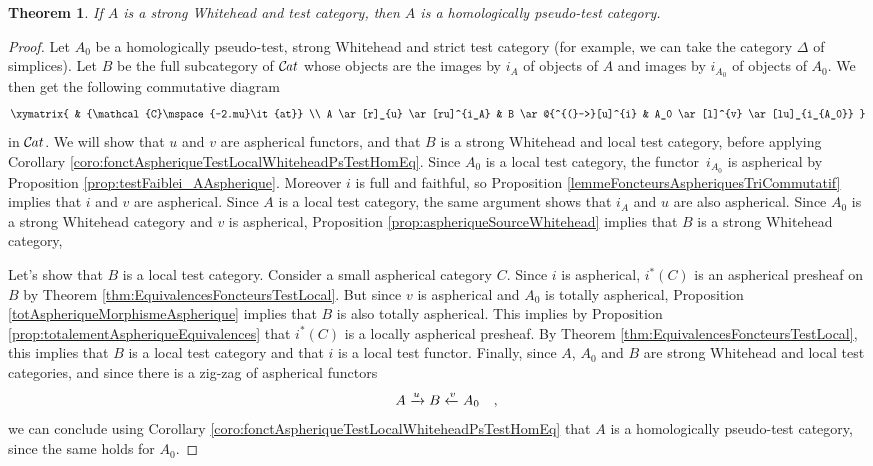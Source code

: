 \documentclass[10pt, english, a4paper, nothms]{amsart}
\theoremstyle{plain}
\newtheorem{theorem}{Theorem}[section]
\theoremstyle{remark}
\theoremstyle{definition}
\numberwithin{equation}{theorem}
\newcommand{\Cat}{{\mathcal{C}\mspace{-2.mu}\it{at}}}
\newcommand\zbox[1]{\makebox[0pt][l]{#1}}
\newcommand\pbox[1]{\zbox{\quad #1}} %
\begin{document}
\begin{theorem}\label{thm:WhiteheadTestHomPseudoTest}
If $A$ is a strong Whitehead and test category, then $A$ is a
homologically pseudo-test category.
\end{theorem}
\begin{proof}
Let $A_0$ be a homologically pseudo-test, strong Whitehead and
strict test category (for example, we can take the category $\Delta$
of simplices). Let $B$ be the full subcategory of $\Cat$ whose objects
are the images by $i_A$ of objects of $A$ and images by $i_{A_0}$ of
objects of $A_0$. We then get the following commutative diagram
\[
\xymatrix{
& \Cat 
\\
A \ar[r]_{u} \ar[ru]^{i_A} &
B \ar@{^{(}->}[u]^{i} &
A_0 \ar[l]^{v} \ar[lu]_{i_{A_0}} 
} 
\]
in $\Cat$. We will show that $u$ and $v$ are aspherical functors, and
that $B$ is a strong Whitehead and local test category, before applying
Corollary \ref{coro:fonctAspheriqueTestLocalWhiteheadPsTestHomEq}.
Since $A_0$ is a local test category, the functor~$i_{A_0}$ is
aspherical by Proposition \ref{prop:testFaiblei_AAspherique}.
Moreover $i$ is full and faithful, so Proposition
\ref{lemmeFoncteursAspheriquesTriCommutatif} implies that $i$ and $v$ are
aspherical. Since $A$ is a local test category, the same argument shows that
$i_A$ and $u$ are also aspherical. Since $A_0$ is a strong Whitehead category
and $v$ is aspherical, Proposition \ref{prop:aspheriqueSourceWhitehead} implies
that $B$ is a strong Whitehead
category,

Let's show that $B$ is a local test category. 
Consider a small aspherical category $C$. Since $i$ is aspherical,
$i^*(C)$ is an aspherical presheaf on $B$ by Theorem
\ref{thm:EquivalencesFoncteursTestLocal}. But since $v$ is aspherical and $A_0$
is totally aspherical,
Proposition \ref{totAspheriqueMorphismeAspherique} implies that $B$ is also
totally aspherical. This implies by Proposition
\ref{prop:totalementAspheriqueEquivalences} that $i^*(C)$ is a locally
aspherical presheaf. By Theorem
\ref{thm:EquivalencesFoncteursTestLocal}, this implies that $B$ is a
local test category and that $i$ is a local test functor.
Finally, since $A$, $A_0$ and $B$ are strong Whitehead and local test
categories, and since there is a zig-zag of aspherical functors
\[
A \xrightarrow{u} B \xleftarrow{v} A_0 \pbox{,}
\]
we can conclude using Corollary
\ref{coro:fonctAspheriqueTestLocalWhiteheadPsTestHomEq} that $A$ is a
homologically pseudo-test category, since the same holds for
$A_0$.
\end{proof}
\end{document}
